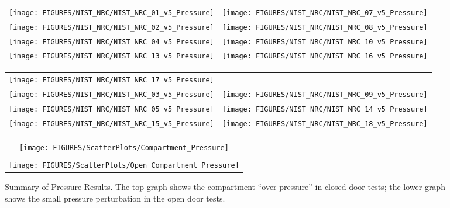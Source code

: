 \begin{figure}[p]
\begin{tabular*}{\textwidth}{l@{\extracolsep{\fill}}r}
\texttt{[image: FIGURES/NIST\_NRC/NIST\_NRC\_01\_v5\_Pressure]} &
\texttt{[image: FIGURES/NIST\_NRC/NIST\_NRC\_07\_v5\_Pressure]} \\
\texttt{[image: FIGURES/NIST\_NRC/NIST\_NRC\_02\_v5\_Pressure]} &
\texttt{[image: FIGURES/NIST\_NRC/NIST\_NRC\_08\_v5\_Pressure]} \\
\texttt{[image: FIGURES/NIST\_NRC/NIST\_NRC\_04\_v5\_Pressure]} &
\texttt{[image: FIGURES/NIST\_NRC/NIST\_NRC\_10\_v5\_Pressure]} \\
\texttt{[image: FIGURES/NIST\_NRC/NIST\_NRC\_13\_v5\_Pressure]} &
\texttt{[image: FIGURES/NIST\_NRC/NIST\_NRC\_16\_v5\_Pressure]}
\end{tabular*}
\label{NIST_NRC_Pressure_Closed}
\end{figure}

\begin{figure}[p]
\begin{tabular*}{\textwidth}{l@{\extracolsep{\fill}}r}
\texttt{[image: FIGURES/NIST\_NRC/NIST\_NRC\_17\_v5\_Pressure]} &
   \\
\texttt{[image: FIGURES/NIST\_NRC/NIST\_NRC\_03\_v5\_Pressure]} &
\texttt{[image: FIGURES/NIST\_NRC/NIST\_NRC\_09\_v5\_Pressure]} \\
\texttt{[image: FIGURES/NIST\_NRC/NIST\_NRC\_05\_v5\_Pressure]} &
\texttt{[image: FIGURES/NIST\_NRC/NIST\_NRC\_14\_v5\_Pressure]} \\
\texttt{[image: FIGURES/NIST\_NRC/NIST\_NRC\_15\_v5\_Pressure]} &
\texttt{[image: FIGURES/NIST\_NRC/NIST\_NRC\_18\_v5\_Pressure]}
\end{tabular*}
\label{NIST_NRC_Pressure_Open}
\end{figure}

\begin{figure}[p]
\begin{center}
\begin{tabular}{c}
\texttt{[image: FIGURES/ScatterPlots/Compartment\_Pressure]} \\
\vspace{0.25in} \\
\texttt{[image: FIGURES/ScatterPlots/Open\_Compartment\_Pressure]} 
\end{tabular}
\end{center}
\caption{Summary of Pressure Results. The top graph shows the compartment ``over-pressure'' in closed door tests; the lower graph
shows the small pressure perturbation in the open door tests.}
\end{figure}


